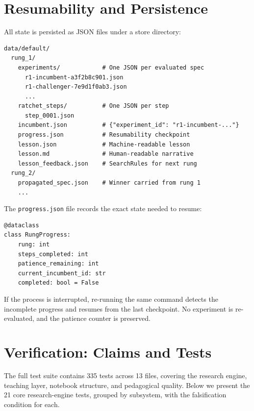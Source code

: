 \documentclass[11pt,a4paper]{article}
\newcommand{\code}[1]{\texttt{#1}}
\begin{document}
\section{Resumability and Persistence}
\label{sec:persistence}

All state is persisted as JSON files under a store directory:

\begin{lstlisting}[style=shell]
data/default/
  rung_1/
    experiments/            # One JSON per evaluated spec
      r1-incumbent-a3f2b8c901.json
      r1-challenger-7e9d1f0ab3.json
      ...
    ratchet_steps/          # One JSON per step
      step_0001.json
    incumbent.json          # {"experiment_id": "r1-incumbent-..."}
    progress.json           # Resumability checkpoint
    lesson.json             # Machine-readable lesson
    lesson.md               # Human-readable narrative
    lesson_feedback.json    # SearchRules for next rung
  rung_2/
    propagated_spec.json    # Winner carried from rung 1
    ...
\end{lstlisting}

The \code{progress.json} file records the exact state needed to resume:

\begin{lstlisting}[style=python]
@dataclass
class RungProgress:
    rung: int
    steps_completed: int
    patience_remaining: int
    current_incumbent_id: str
    completed: bool = False
\end{lstlisting}

If the process is interrupted, re-running the same command detects the
incomplete progress and resumes from the last checkpoint. No experiment is
re-evaluated, and the patience counter is preserved.

\section{Verification: Claims and Tests}
\label{sec:verification_claims}

The full test suite contains 335 tests across 13 files, covering the research
engine, teaching layer, notebook structure, and pedagogical quality. Below we
present the 21 core research-engine tests, grouped by subsystem, with the
falsification condition for each.
\end{document}
